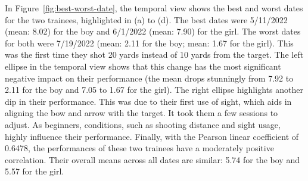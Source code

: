 \documentclass[runningheads]{llncs}
\begin{document}
In Figure~\ref{fig:best-worst-date}, the temporal view shows the best and worst dates for the two trainees, highlighted in (a) to (d). 
The best dates were 5/11/2022 (mean: 8.02) for the boy and 6/1/2022 (mean: 7.90) for the girl. 
The worst dates for both were 7/19/2022 (mean: 2.11 for the boy; mean: 1.67 for the girl). This was the first time they shot 20 yards instead of 10 yards from the target. 
The left ellipse in the temporal view shows that this change has the most significant negative impact on their performance (the mean drops stunningly from 7.92 to 2.11 for the boy and 7.05 to 1.67 for the girl). 
The right ellipse highlights another dip in their performance. 
This was due to their first use of sight, which aids in aligning the bow and arrow with the target. 
It took them a few sessions to adjust. 
As beginners, conditions, such as shooting distance and sight usage, highly influence their performance.  
Finally, with the Pearson linear coefficient of 0.6478, the performances of these two trainees have a moderately positive correlation. 
Their overall means across all dates are similar: 5.74 for the boy and 5.57 for the girl. 
\end{document}
